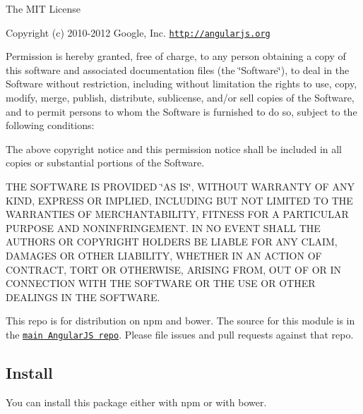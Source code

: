 The M\-I\-T License

Copyright (c) 2010-\/2012 Google, Inc. \href{http://angularjs.org}{\tt http\-://angularjs.\-org}

Permission is hereby granted, free of charge, to any person obtaining a copy of this software and associated documentation files (the \char`\"{}\-Software\char`\"{}), to deal in the Software without restriction, including without limitation the rights to use, copy, modify, merge, publish, distribute, sublicense, and/or sell copies of the Software, and to permit persons to whom the Software is furnished to do so, subject to the following conditions\-:

The above copyright notice and this permission notice shall be included in all copies or substantial portions of the Software.

T\-H\-E S\-O\-F\-T\-W\-A\-R\-E I\-S P\-R\-O\-V\-I\-D\-E\-D \char`\"{}\-A\-S I\-S\char`\"{}, W\-I\-T\-H\-O\-U\-T W\-A\-R\-R\-A\-N\-T\-Y O\-F A\-N\-Y K\-I\-N\-D, E\-X\-P\-R\-E\-S\-S O\-R I\-M\-P\-L\-I\-E\-D, I\-N\-C\-L\-U\-D\-I\-N\-G B\-U\-T N\-O\-T L\-I\-M\-I\-T\-E\-D T\-O T\-H\-E W\-A\-R\-R\-A\-N\-T\-I\-E\-S O\-F M\-E\-R\-C\-H\-A\-N\-T\-A\-B\-I\-L\-I\-T\-Y, F\-I\-T\-N\-E\-S\-S F\-O\-R A P\-A\-R\-T\-I\-C\-U\-L\-A\-R P\-U\-R\-P\-O\-S\-E A\-N\-D N\-O\-N\-I\-N\-F\-R\-I\-N\-G\-E\-M\-E\-N\-T. I\-N N\-O E\-V\-E\-N\-T S\-H\-A\-L\-L T\-H\-E A\-U\-T\-H\-O\-R\-S O\-R C\-O\-P\-Y\-R\-I\-G\-H\-T H\-O\-L\-D\-E\-R\-S B\-E L\-I\-A\-B\-L\-E F\-O\-R A\-N\-Y C\-L\-A\-I\-M, D\-A\-M\-A\-G\-E\-S O\-R O\-T\-H\-E\-R L\-I\-A\-B\-I\-L\-I\-T\-Y, W\-H\-E\-T\-H\-E\-R I\-N A\-N A\-C\-T\-I\-O\-N O\-F C\-O\-N\-T\-R\-A\-C\-T, T\-O\-R\-T O\-R O\-T\-H\-E\-R\-W\-I\-S\-E, A\-R\-I\-S\-I\-N\-G F\-R\-O\-M, O\-U\-T O\-F O\-R I\-N C\-O\-N\-N\-E\-C\-T\-I\-O\-N W\-I\-T\-H T\-H\-E S\-O\-F\-T\-W\-A\-R\-E O\-R T\-H\-E U\-S\-E O\-R O\-T\-H\-E\-R D\-E\-A\-L\-I\-N\-G\-S I\-N T\-H\-E S\-O\-F\-T\-W\-A\-R\-E.

This repo is for distribution on {\ttfamily npm} and {\ttfamily bower}. The source for this module is in the \href{https://github.com/angular/angular.js/tree/master/src/ngRoute}{\tt main Angular\-J\-S repo}. Please file issues and pull requests against that repo.

\subsection*{Install}

You can install this package either with {\ttfamily npm} or with {\ttfamily bower}.

